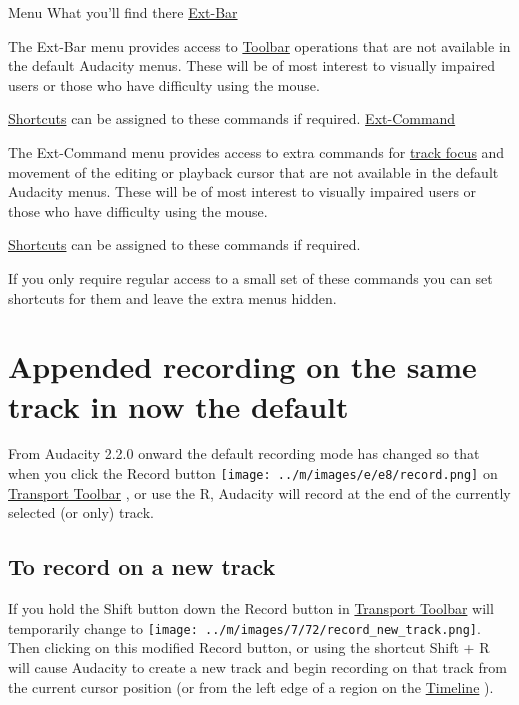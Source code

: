\documentclass[]{book}
\begin{document}
\begin{multicols}{2}
Menu
What you'll find there
\hyperref[ext_bar_menu_]{
Ext-Bar}

The Ext-Bar menu provides access to 
\hyperref[toolbars_overview_]{Toolbar}
 operations that are not available in the default Audacity menus. These will be of most interest to visually impaired users or those who have difficulty using the mouse.


\hyperref[keyboard_preferences_]{Shortcuts}
 can be assigned to these commands if required.
\hyperref[ext_command_menu_]{
Ext-Command}

The Ext-Command menu provides access to extra commands for 
\hyperref[audio_tracks__focus]{track focus}
 and movement of the editing or playback cursor that are not available in the default Audacity menus. These will be of most interest to visually impaired users or those who have difficulty using the mouse.


\hyperref[keyboard_preferences_]{Shortcuts}
 can be assigned to these commands if required.

If you only require regular access to a small set of these commands you can set shortcuts for them and leave the extra menus hidden.



\section{Appended recording on the same track in now the default}


From Audacity 2.2.0 onward the default recording mode has changed so that when you click the Record button \texttt{[image: ../m/images/e/e8/record.png]} on 
\hyperref[transport_toolbar_]{Transport Toolbar}
, or use the R, Audacity will record at the end of the currently selected (or only) track.

\subsection{To record on a new track}


If you hold the Shift button down the Record button in 
\hyperref[transport_toolbar_]{Transport Toolbar}
 will temporarily change to \texttt{[image: ../m/images/7/72/record\_new\_track.png]}. Then clicking on this modified Record button, or using the shortcut Shift + R will cause Audacity to create a new track and begin recording on that track from the current cursor position (or from the left edge of a region on the 
\hyperref[timeline_]{Timeline}
). 



\end{multicols}
\end{document}
